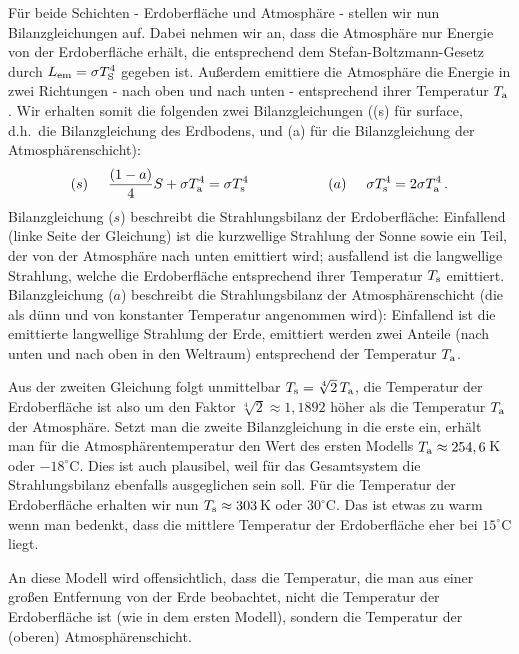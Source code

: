 F\"ur beide Schichten - Erdoberfl\"ache und Atmosph\"are - stellen wir nun
Bilanzgleichungen auf. Dabei nehmen wir an, dass die Atmosph\"are nur Energie
von der Erdoberfl\"ache erh\"alt, die entsprechend dem Stefan-Boltzmann-Gesetz
durch $L_{\rm em}=\sigma T_{\rm S}^4$ gegeben ist. Au\ss erdem emittiere die
Atmosph\"are die Energie in zwei Richtungen - nach oben und nach unten - 
entsprechend ihrer Temperatur $T_{\rm a}$. Wir erhalten somit die folgenden zwei
Bilanzgleichungen ((s) f\"ur \glqq surface\grqq, d.h.\ die Bilanzgleichung des Erdbodens,
und (a) f\"ur die Bilanzgleichung der Atmosph\"arenschicht):
\begin{equation}
            (s) \hspace{0.5cm}  \frac{(1-a)}{4} S  +  \sigma T_{\rm a}^4 = \sigma T_{\rm s}^4 \hspace{2cm}
            (a) \hspace{0.5cm}  \sigma T_{\rm s}^4  = 2 \sigma T_{\rm a}^4 \, .
\end{equation}
Bilanzgleichung ($s$) beschreibt die Strahlungsbilanz der Erdoberfl\"ache: Einfallend 
(linke Seite der Gleichung) ist die
kurzwellige Strahlung der Sonne sowie ein Teil, der von der Atmosph\"are nach unten emittiert wird;
ausfallend ist die langwellige Strahlung, welche die Erdoberfl\"ache entsprechend ihrer
Temperatur $T_{\rm s}$ emittiert. Bilanzgleichung ($a$)
beschreibt die Strahlungsbilanz der Atmosph\"arenschicht (die als d\"unn und von konstanter Temperatur
angenommen wird): Einfallend ist die emittierte langwellige Strahlung der Erde, emittiert werden
zwei Anteile (nach unten und nach oben in den Weltraum) entsprechend der Temperatur $T_{\rm a}$.

Aus der zweiten Gleichung folgt unmittelbar $T_{\rm s} = \sqrt[4]{2}\, T_{\rm a}$, die Temperatur der
Erdoberfl\"ache ist also um den Faktor $\sqrt[4]{2} \approx 1,1892$ h\"oher als die Temperatur $T_{\rm a}$ der
Atmosph\"are. Setzt man die zweite Bilanzgleichung in die erste ein, erh\"alt man f\"ur die Atmosph\"arentemperatur
den Wert des ersten Modells $T_{\rm a} \approx 254,6$\,K oder $-18^\circ$C. Dies ist auch plausibel, weil f\"ur das
Gesamtsystem die Strahlungsbilanz ebenfalls ausgeglichen sein soll. F\"ur die Temperatur der Erdoberfl\"ache
erhalten wir nun $T_{\rm s}\approx 303$\,K oder $30^\circ$C. Das ist etwas zu warm wenn man bedenkt, dass die
mittlere Temperatur der Erdoberfl\"ache eher bei $15^\circ$C liegt. 

An diese Modell wird offensichtlich, dass die Temperatur, die man aus einer gro\ss en Entfernung von der
Erde beobachtet, nicht die Temperatur der Erdoberfl\"ache ist (wie in dem ersten Modell), sondern die
Temperatur der (oberen) Atmosph\"arenschicht. 


